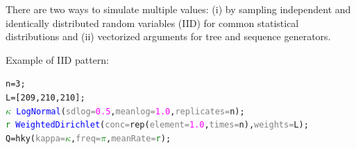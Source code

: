 \documentclass[10pt,letterpaper,table]{article}
\begin{document}
There are two ways to simulate multiple values: (i) by sampling independent and identically distributed random variables (IID) for common statistical distributions and (ii) vectorized arguments for tree and sequence generators.

Example of IID pattern: 
{\small
  \begin{alltt}
    n = 3;
    L = [209, 210, 210];
    \textcolor{green}{\(\kappa\)} ~ \textcolor{blue}{LogNormal}(\textcolor{gray}{sdlog=}\textcolor{magenta}{0.5}, \textcolor{gray}{meanlog=}\textcolor{magenta}{1.0}, \textcolor{gray}{replicates=}n);
    \textcolor{green}{r} ~ \textcolor{blue}{WeightedDirichlet}(\textcolor{gray}{conc=}\textcolor{magenta!80!black}{rep}(\textcolor{gray}{element=}\textcolor{magenta}{1.0}, \textcolor{gray}{times=}n), \textcolor{gray}{weights=}L);
    Q = \textcolor{magenta!80!black}{hky}(\textcolor{gray}{kappa=}\textcolor{green}{\(\kappa\)}, \textcolor{gray}{freq=}\textcolor{green}{\(\pi\)}, \textcolor{gray}{meanRate=}\textcolor{green}{r});
  \end{alltt}
}
\end{document}
